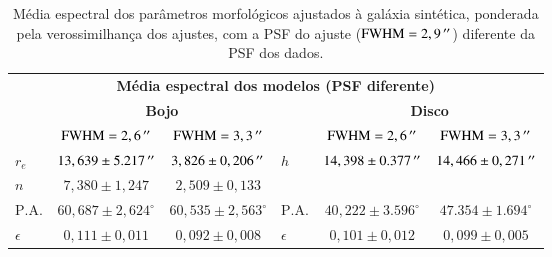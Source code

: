 \begin{table}
\begin{tabular}{ l c c  l c c }
  \hline
  \multicolumn{6}{c}{\textbf{Média espectral dos modelos (PSF diferente)}} \\
  & \multicolumn{2}{c}{\textbf{Bojo}} & & \multicolumn{2}{c}{\textbf{Disco}} \\
  & $\mathrm{FWHM} = 2,6\,^{\prime\prime}$ & $\mathrm{FWHM} = 3,3\,^{\prime\prime}$ & &
  $\mathrm{FWHM} = 2,6\,^{\prime\prime}$ & $\mathrm{FWHM} = 3,3\,^{\prime\prime}$ \\
  \hline
  $r_e$ & $13,639 \pm 5.217\,^{\prime\prime}$ & $3,826 \pm 0,206\,^{\prime\prime}$ & $h$ & $14,398
  \pm 0.377\,^{\prime\prime}$ & $14,466 \pm 0,271\,^{\prime\prime}$ \\
  $n$ & $7,380 \pm 1,247$ & $2,509 \pm 0,133$ & & & \\
  $\mathrm{P.A.}$ & $60,687 \pm 2,624^\circ$ & $60,535 \pm
  2,563^\circ$ & $\mathrm{P.A.}$ & $40,222 \pm 3.596^\circ$ & $47.354 \pm
  1.694^\circ$ \\
  $\epsilon$ & $0,111 \pm 0,011$ & $0,092 \pm 0,008$ & $\epsilon$ & $0,101 \pm
  0,012$ & $0,099 \pm 0,005$ \\
  \hline
\end{tabular}
\caption[Parâmetros do ajuste morfológico espectral com PSF diferente]
{Média espectral dos parâmetros morfológicos ajustados à galáxia sintética,
ponderada pela verossimilhança dos ajustes, com a PSF do ajuste ($\mathrm{FWHM}
= 2,9\,^{\prime\prime}$) diferente da PSF dos dados.}
\label{tab:testeAjustePSF}
\end{table}

